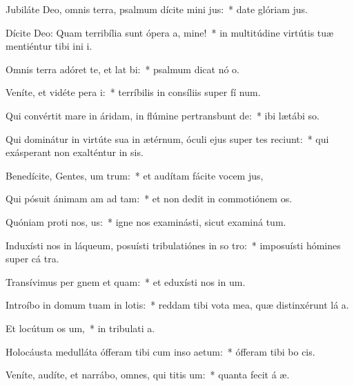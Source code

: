 \item Jubiláte Deo, omnis terra, psalmum dícite mini jus:~* date glóriam  jus.
\item Dícite Deo: Quam terribília sunt ópera a, mine!~* in multitúdine virtútis tuæ mentiéntur tibi ini i.
\item Omnis terra adóret te, et lat bi:~* psalmum dicat nó o.
\item Veníte, et vidéte pera i:~* terríbilis in consíliis super fí num.
\item Qui convértit mare in áridam, in flúmine pertransbunt de:~* ibi lætábi  so.
\item Qui dominátur in virtúte sua in ætérnum, óculi ejus super tes reciunt:~* qui exásperant non exalténtur in sis.
\item Benedícite, Gentes, um trum:~* et audítam fácite vocem  jus,
\item Qui pósuit ánimam am ad tam:~* et non dedit in commotiónem  os.
\item Quóniam proti nos, us:~* igne nos examinásti, sicut examiná tum.
\item Induxísti nos in láqueum, posuísti tribulatiónes in so tro:~* imposuísti hómines super cá tra.
\item Transívimus per gnem et quam:~* et eduxísti nos in um.
\item Introíbo in domum tuam in lotis:~* reddam tibi vota mea, quæ distinxérunt lá a.
\item Et locútum  os um,~* in tribulati a.
\item Holocáusta medulláta ófferam tibi cum inso aetum:~* ófferam tibi bo  cis.
\item Veníte, audíte, et narrábo, omnes, qui titis um:~* quanta fecit á æ.
